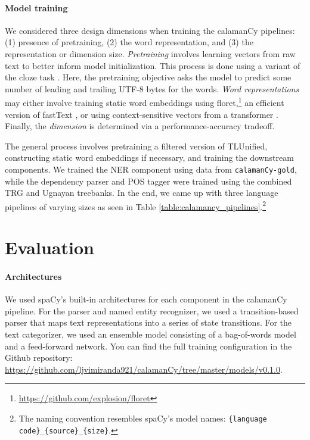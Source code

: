 \documentclass[11pt]{article}
\begin{document}
\paragraph*{Model training}

We considered three design dimensions when training the calamanCy pipelines: (1) presence of pretraining, (2) the word representation, and (3) the representation or dimension size.
\textit{Pretraining} involves learning vectors from raw text to better inform model initialization.
This process is done using a variant of the cloze task \citep{Devlin2019BERTPO}.
Here, the pretraining objective asks the model to predict some number of leading and trailing UTF-8 bytes for the words.
\textit{Word representations} may either involve training static word embeddings using floret,\footnote[3]{\url{https://github.com/explosion/floret}} an efficient version of fastText \citep{Bojanowski2016EnrichingWV}, or using context-sensitive vectors from a transformer \citep{Vaswani2017AttentionIA}.
Finally, the \textit{dimension} is determined via a performance-accuracy tradeoff.


The general process involves pretraining a filtered version of TLUnified, constructing static word embeddings if necessary, and training the downstream components.
We trained the NER component using data from \texttt{calamanCy-gold}, while the dependency parser and POS tagger were trained using the combined TRG and Ugnayan treebanks.
In the end, we came up with three language pipelines of varying sizes as seen in Table \ref{table:calamancy_pipelines}.\footnote[4]{
  The naming convention resembles spaCy's model names: \texttt{\{language code\}\_\{source\}\_\{size\}}. 
}

\section{Evaluation}



\paragraph*{Architectures}

We used spaCy's built-in architectures for each component in the calamanCy pipeline.
For the parser and named entity recognizer, we used a transition-based parser that maps text representations into a series of state transitions.
For the text categorizer, we used an ensemble model consisting of a bag-of-words model and a feed-forward network.
You can find the full training configuration in the Github repository: \url{https://github.com/ljvimiranda921/calamanCy/tree/master/models/v0.1.0}.
\end{document}

